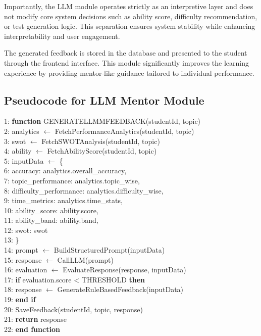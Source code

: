 \begin{sloppypar}
Importantly, the LLM module operates strictly as an interpretive layer and does not modify core system decisions such as ability score, difficulty recommendation, or test generation logic. This separation ensures system stability while enhancing interpretability and user engagement.

The generated feedback is stored in the database and presented to the student through the frontend interface. This module significantly improves the learning experience by providing mentor-like guidance tailored to individual performance.

\subsection{Pseudocode for LLM Mentor Module}

1: \textbf{function} GENERATELLMMFEEDBACK(studentId, topic)\\
2: \quad analytics $\leftarrow$ FetchPerformanceAnalytics(studentId, topic)\\
3: \quad swot $\leftarrow$ FetchSWOTAnalysis(studentId, topic)\\
4: \quad ability $\leftarrow$ FetchAbilityScore(studentId, topic)\\
5: \quad inputData $\leftarrow$ \{\\
6: \qquad accuracy: analytics.overall\_accuracy,\\
7: \qquad topic\_performance: analytics.topic\_wise,\\
8: \qquad difficulty\_performance: analytics.difficulty\_wise,\\
9: \qquad time\_metrics: analytics.time\_stats,\\
10: \qquad ability\_score: ability.score,\\
11: \qquad ability\_band: ability.band,\\
12: \qquad swot: swot\\
13: \quad \}\\
14: \quad prompt $\leftarrow$ BuildStructuredPrompt(inputData)\\
15: \quad response $\leftarrow$ CallLLM(prompt)\\
16: \quad evaluation $\leftarrow$ EvaluateResponse(response, inputData)\\
17: \quad \textbf{if} evaluation.score < THRESHOLD \textbf{then}\\
18: \qquad response $\leftarrow$ GenerateRuleBasedFeedback(inputData)\\
19: \quad \textbf{end if}\\
20: \quad SaveFeedback(studentId, topic, response)\\
21: \quad \textbf{return} response\\
22: \textbf{end function}
\algofooter


\end{sloppypar}
